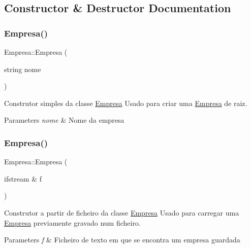 \subsection{Constructor \& Destructor Documentation}
\mbox{\label{class_empresa_ac5bccaf3758b25fea4803a63d4362236}} 
\subsubsection{\texorpdfstring{Empresa()}{Empresa()}\hspace{0.1cm}{\footnotesize\ttfamily [1/3]}}
{\footnotesize\ttfamily Empresa\+::\+Empresa (\begin{DoxyParamCaption}\item[{string}]{nome }\end{DoxyParamCaption})}



Construtor simples da classe \mbox{\hyperlink{class_empresa}{Empresa}} Usado para criar uma \mbox{\hyperlink{class_empresa}{Empresa}} de raiz. 


\begin{DoxyParams}{Parameters}
{\em nome} & Nome da empresa \\
\hline
\end{DoxyParams}
\mbox{\label{class_empresa_a3eabce52f65fae491d7b3dc28d6eb6e5}} 
\subsubsection{\texorpdfstring{Empresa()}{Empresa()}\hspace{0.1cm}{\footnotesize\ttfamily [2/3]}}
{\footnotesize\ttfamily Empresa\+::\+Empresa (\begin{DoxyParamCaption}\item[{ifstream \&}]{f }\end{DoxyParamCaption})}



Construtor a partir de ficheiro da classe \mbox{\hyperlink{class_empresa}{Empresa}} Usado para carregar uma \mbox{\hyperlink{class_empresa}{Empresa}} previamente gravado num ficheiro. 


\begin{DoxyParams}{Parameters}
{\em f} & Ficheiro de texto em que se encontra um empresa guardada \\
\hline
\end{DoxyParams}
\mbox{\label{class_empresa_a093f61d3da9863f22291e02cbaed05e7}} 
